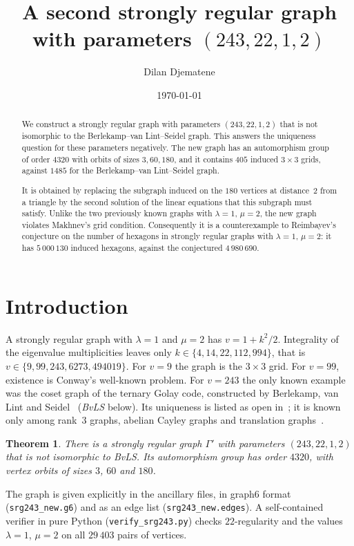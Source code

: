\documentclass[11pt]{amsart}
\title{A second strongly regular graph with parameters $(243,22,1,2)$}
\author{Dilan Djematene}
\date{\today}
\newtheorem{theorem}{Theorem}
\theoremstyle{remark}
\begin{document}
\begin{abstract}
We construct a strongly regular graph with parameters $(243,22,1,2)$ that is not isomorphic to the
Berlekamp--van Lint--Seidel graph. This answers the uniqueness question for these parameters negatively. The new graph
has an automorphism group of order $4320$ with orbits of sizes $3,60,180$, and it contains $405$ induced $3\times3$
grids, against $1485$ for the Berlekamp--van Lint--Seidel graph.

It is obtained by replacing the subgraph induced on the $180$ vertices at distance~$2$ from a triangle by the second
solution of the linear equations that this subgraph must satisfy. Unlike the two previously known graphs with
$\lambda=1$, $\mu=2$, the new graph violates Makhnev's grid condition. Consequently it is a counterexample to
Reimbayev's conjecture on the number of hexagons in strongly regular graphs with $\lambda=1$, $\mu=2$: it has
$5\,000\,130$ induced hexagons, against the conjectured $4\,980\,690$.
\end{abstract}
\maketitle

\section{Introduction}
A strongly regular graph with $\lambda=1$ and $\mu=2$ has $v=1+k^2/2$. Integrality of the eigenvalue multiplicities
leaves only $k\in\{4,14,22,112,994\}$, that is $v\in\{9,99,243,6273,494019\}$. For $v=9$ the graph is the $3\times3$
grid. For $v=99$, existence is Conway's well-known problem. For $v=243$ the only known example was the coset graph of
the ternary Golay code, constructed by Berlekamp, van Lint and Seidel~\cite{BvLS} (\emph{BvLS} below). Its uniqueness is
listed as open in~\cite{BvM,Btab,Zaw}; it is known only among rank~$3$ graphs, abelian Cayley graphs and translation
graphs~\cite{BvM}.

\begin{theorem}\label{thm:main}
There is a strongly regular graph $\Gamma'$ with parameters $(243,22,1,2)$ that is not isomorphic to BvLS.
Its automorphism group has order $4320$, with vertex orbits of sizes $3$, $60$ and $180$.
\end{theorem}

The graph is given explicitly in the ancillary files, in graph6 format (\texttt{srg243\_new.g6}) and as an
edge list (\texttt{srg243\_new.edges}). A self-contained verifier in pure Python (\texttt{verify\_srg243.py}) checks $22$-regularity and the values $\lambda=1$,
$\mu=2$ on all $29\,403$ pairs of vertices.
\end{document}

